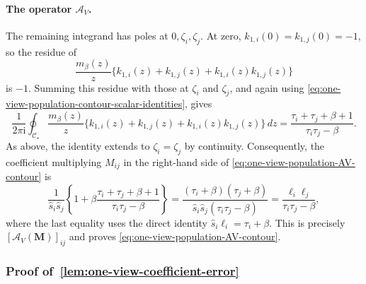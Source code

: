 \documentclass[11pt]{article}
\begin{document}
\paragraph{The operator $\mathcal A_V$.}
The remaining integrand has poles at
$0,\zeta_i,\zeta_j$.  At zero,
$k_{1,i}(0)=k_{1,j}(0)=-1$, so the residue of
\[
  \frac{m_\beta(z)}{z}
  \bigl\{
    k_{1,i}(z)
    +
    k_{1,j}(z)
    +
    k_{1,i}(z)k_{1,j}(z)
  \bigr\}
\]
is $-1$.  Summing this residue with those at
$\zeta_i$ and $\zeta_j$, and again using
\cref{eq:one-view-population-contour-scalar-identities}, gives
\[
  \frac{1}{2\pi\mathrm i}
  \oint_{\mathcal C_\star}
  \frac{m_\beta(z)}{z}
  \bigl\{
    k_{1,i}(z)
    +
    k_{1,j}(z)
    +
    k_{1,i}(z)k_{1,j}(z)
  \bigr\}\,dz
  =
  \frac{
    \tau_i+\tau_j+\beta+1
  }{
    \tau_i\tau_j-\beta
  }.
\]
As above, the identity extends to $\zeta_i=\zeta_j$ by continuity.
Consequently, the coefficient multiplying $M_{ij}$ in the right-hand side
of \cref{eq:one-view-population-AV-contour} is
\[
  \frac{1}{\widehat s_i\widehat s_j}
  \left\{
    1+
    \beta
    \frac{
      \tau_i+\tau_j+\beta+1
    }{
      \tau_i\tau_j-\beta
    }
  \right\}
  =
  \frac{
    (\tau_i+\beta)(\tau_j+\beta)
  }{
    \widehat s_i\widehat s_j(\tau_i\tau_j-\beta)
  }
  =
  \frac{
    \ell_i\ell_j
  }{
    \tau_i\tau_j-\beta
  },
\]
where the last equality uses the direct identity
$\widehat s_i\ell_i=\tau_i+\beta$.  This is precisely
$[\mathcal A_V(\bm{M})]_{ij}$ and proves
\cref{eq:one-view-population-AV-contour}.


\subsubsection{Proof of~\cref{lem:one-view-coefficient-error}}
\end{document}
